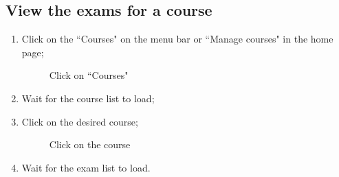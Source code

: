 \documentclass[ManualeUtente]{subfiles}
\begin{document}
\subsection{View the exams for a course}
\begin{enumerate}
	\item Click on the \textquotedblleft Courses" on the menu bar or \textquotedblleft Manage courses" in the home page;
	\begin{figure}[H]
		\centering
		\caption{Click on ``Courses"}
		\label{fig:Click on "Courses"}
	\end{figure}
	\item Wait for the course list to load;
	\item Click on the desired course;
	\begin{figure}[H]
		\centering
		\caption{Click on the course}
		\label{fig:Click on the course}
	\end{figure}
	\item Wait for the exam list to load.

\end{enumerate}
\end{document}
